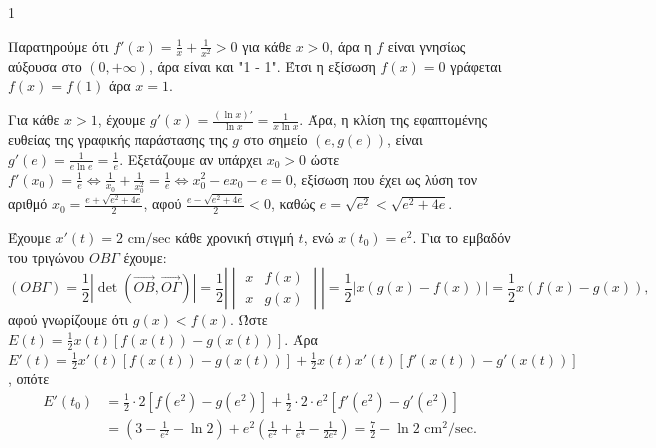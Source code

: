 \begin{ylh}{1}
    \item [Ύλη από εικόνα]
\end{ylh}
\begin{alist}
    \item Παρατηρούμε ότι $f'(x) = \frac{1}{x} + \frac{1}{x^2} > 0$ για κάθε $x > 0$, άρα η $f$ είναι γνησίως αύξουσα στο $(0, +\infty)$, άρα είναι και "1 - 1".
    Έτσι η εξίσωση $f(x) = 0$ γράφεται $f(x) = f(1)$ άρα $x = 1$. 

    \item Για κάθε $x > 1$, έχουμε $g'(x) = \frac{(\ln x)'}{\ln x} = \frac{1}{x \ln x}$.
    Άρα, η κλίση της εφαπτομένης ευθείας της γραφικής παράστασης της $g$ στο σημείο $(e, g(e))$, είναι $g'(e) = \frac{1}{e \ln e} = \frac{1}{e}$.
    Εξετάζουμε αν υπάρχει $x_0 > 0$ ώστε $f'(x_0) = \frac{1}{e} \Leftrightarrow \frac{1}{x_0} + \frac{1}{x_0^2} = \frac{1}{e} \Leftrightarrow x_0^2 - e x_0 - e = 0$,
    εξίσωση που έχει ως λύση τον αριθμό $x_0 = \frac{e + \sqrt{e^2 + 4e}}{2}$, αφού $\frac{e - \sqrt{e^2 + 4e}}{2} < 0$, καθώς $e = \sqrt{e^2} < \sqrt{e^2 + 4e}$. 

    \item Έχουμε $x'(t) = 2 \text{ cm/sec}$ κάθε χρονική στιγμή $t$, ενώ $x(t_0) = e^2$.
    Για το εμβαδόν του τριγώνου $OB\Gamma$ έχουμε:
    \[
    (OB\Gamma) = \frac{1}{2} \left| \det (\vec{OB}, \vec{O\Gamma}) \right| = \frac{1}{2} \left| \begin{vmatrix} x & f(x) \\ x & g(x) \end{vmatrix} \right| = \frac{1}{2} |x(g(x) - f(x))| = \frac{1}{2} x(f(x) - g(x)),
    \]
    αφού γνωρίζουμε ότι $g(x) < f(x)$.
    Ώστε $E(t) = \frac{1}{2} x(t)[f(x(t)) - g(x(t))]$.
    Άρα $E'(t) = \frac{1}{2} x'(t)[f(x(t)) - g(x(t))] + \frac{1}{2} x(t)x'(t)[f'(x(t)) - g'(x(t))]$, οπότε
    \begin{align*}
    E'(t_0) &= \frac{1}{2} \cdot 2[f(e^2) - g(e^2)] + \frac{1}{2} \cdot 2 \cdot e^2[f'(e^2) - g'(e^2)] \\
    &= \left(3 - \frac{1}{e^2} - \ln 2\right) + e^2 \left(\frac{1}{e^2} + \frac{1}{e^4} - \frac{1}{2e^2}\right) = \frac{7}{2} - \ln 2 \text{ cm}^2/\text{sec}.
    \end{align*} 
\end{alist}